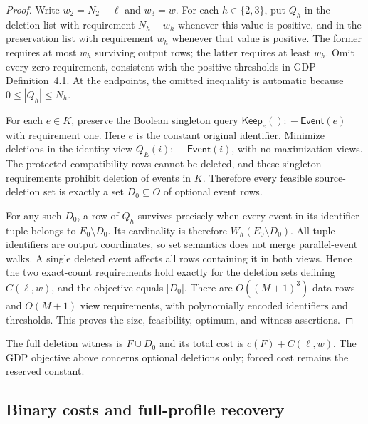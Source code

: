 \begin{proof}
Write $w_2=N_2-\ell$ and $w_3=w$. For each $h\in\{2,3\}$, put $Q_h$ in
the deletion list with requirement $N_h-w_h$ whenever this value is positive,
and in the preservation list with requirement $w_h$ whenever that value is
positive. The former requires at most $w_h$ surviving output rows; the latter
requires at least $w_h$. Omit every zero requirement, consistent with the
positive thresholds in GDP Definition~4.1. At the endpoints, the omitted
inequality is automatic because $0\le |Q_h|\le N_h$.

For each $e\in K$, preserve the Boolean singleton query
$\mathsf{Keep}_e()\mathbin{:\!-}\mathsf{Event}(e)$ with requirement one.
Here $e$ is the constant original identifier. Minimize deletions in the
identity view $Q_E(i)\mathbin{:\!-}\mathsf{Event}(i)$, with no maximization
views. The protected compatibility rows cannot be deleted, and these
singleton requirements prohibit deletion of events in $K$. Therefore every
feasible source-deletion set is exactly a set $D_0\subseteq O$ of optional
event rows.

For any such $D_0$, a row of $Q_h$ survives precisely when every event in its
identifier tuple belongs to $E_0\setminus D_0$. Its cardinality is therefore
$W_h(E_0\setminus D_0)$. All tuple identifiers are output coordinates, so set
semantics does not merge parallel-event walks. A single deleted event affects
all rows containing it in both views. Hence the two exact-count requirements
hold exactly for the deletion sets defining $C(\ell,w)$, and the objective
equals $|D_0|$. There are $O((M+1)^3)$ data rows and $O(M+1)$ view
requirements, with polynomially encoded identifiers and thresholds. This
proves the size, feasibility, optimum, and witness assertions.
\end{proof}

The full deletion witness is $F\cup D_0$ and its total cost is
$c(F)+C(\ell,w)$. The GDP objective above concerns optional deletions only;
forced cost remains the reserved constant.

\subsection{Binary costs and full-profile recovery}

